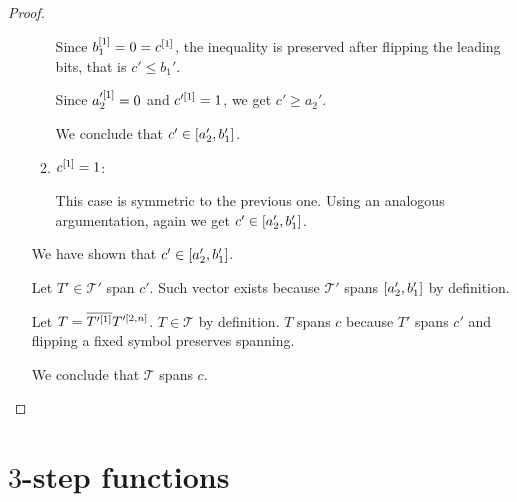 \begin{proof}
\begin{enumerate}
\begin{enumerate}
Since $b_1^{[1]} = 0 = c^{[1]}$,
the inequality is preserved
after flipping the leading bits,
that is $c' \leq b_1'$.

Since $a_2'^{[1]} = 0$ and $c'^{[1]} = 1$,
we get $c' \geq a_2'$.

We conclude that $c' \in [a_2', b_1']$.

\item $c^{[1]} = 1$:

This case is symmetric to the previous one.
Using an analogous argumentation,
again we get $c' \in [a_2', b_1']$.
\end{enumerate}

We have shown that $c' \in [a_2', b_1']$.

Let $T' \in \mathcal{T}'$ span $c'$.
Such vector exists because
$\mathcal{T}'$ spans $[a_2', b_1']$
by definition.

Let $T = \overline{T'^{[1]}} T'^{[2, n]}$.
$T \in \mathcal{T}$ by definition.
$T$ spans $c$ because $T'$ spans $c'$
and flipping a fixed symbol preserves spanning.

We conclude that $\mathcal{T}$ spans $c$.

\end{enumerate}
\end{proof}

\section{\texorpdfstring{$3$}{3}-step functions}

